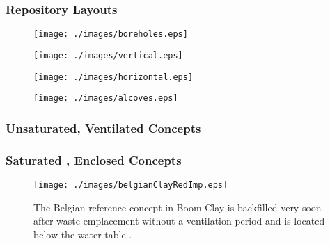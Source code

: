 \begin{frame}
  \frametitle{Repository Layouts}

  \begin{minipage}{0.49\textwidth}
    \begin{figure}[h!]
      \texttt{[image: ./images/boreholes.eps]}
    \end{figure}
    \begin{figure}[h!]
      \texttt{[image: ./images/vertical.eps]}
    \end{figure}
  \end{minipage}
  \hspace{0.01cm}
  \begin{minipage}{0.49\textwidth}
    \begin{figure}[h!]
      \texttt{[image: ./images/horizontal.eps]}
    \end{figure}
    \begin{figure}[h!]
      \texttt{[image: ./images/alcoves.eps]}
    \end{figure}
  \end{minipage}

\end{frame}

\begin{frame}[ctb!]
  \footnotesize{
  \frametitle{Unsaturated, Ventilated Concepts}
  
}
\end{frame}

\begin{frame}[ctb!]
  \footnotesize{
  \frametitle{Saturated , Enclosed Concepts} 
 \begin{figure}[h!]
    \begin{center}
      \texttt{[image: ./images/belgianClayRedImp.eps]}
    \end{center}
    \caption{The Belgian reference concept in Boom Clay is backfilled very soon
   after waste emplacement without a ventilation period and is located below the water table
   \cite{von_lensa_red-impact_2008}.}
    \label{fig:belgianClayRedImp}
  \end{figure}
}
\end{frame}
